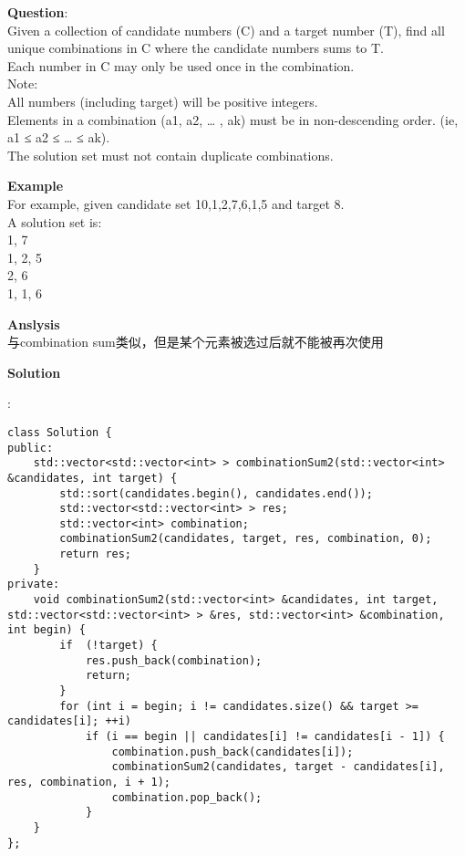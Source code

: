     
\begin{description}
    \item{\textbf{Question}}:\\%
		Given a collection of candidate numbers (C) and a target number (T), find all unique combinations in C where the candidate numbers sums to T.\\
		Each number in C may only be used once in the combination.\\
		Note:\\
		All numbers (including target) will be positive integers.\\
		Elements in a combination (a1, a2, … , ak) must be in non-descending order. (ie, a1 ≤ a2 ≤ … ≤ ak).\\
		The solution set must not contain duplicate combinations.\\

    \item{\textbf{Example}}\\
		For example, given candidate set 10,1,2,7,6,1,5 and target 8.\\
		A solution set is:\\
		1, 7\\
		1, 2, 5\\
		2, 6\\
		1, 1, 6\\

    \item{\textbf{Anslysis}}\\
		与combination sum类似，但是某个元素被选过后就不能被再次使用\\

    \item{\textbf{Solution}}\\
	\item{} : \\
		\begin{lstlisting}
class Solution {
public:
    std::vector<std::vector<int> > combinationSum2(std::vector<int> &candidates, int target) {
        std::sort(candidates.begin(), candidates.end());
        std::vector<std::vector<int> > res;
        std::vector<int> combination;
        combinationSum2(candidates, target, res, combination, 0);
        return res;
    }
private:
    void combinationSum2(std::vector<int> &candidates, int target, std::vector<std::vector<int> > &res, std::vector<int> &combination, int begin) {
        if  (!target) {
            res.push_back(combination);
            return;
        }
        for (int i = begin; i != candidates.size() && target >= candidates[i]; ++i)
            if (i == begin || candidates[i] != candidates[i - 1]) {
                combination.push_back(candidates[i]);
                combinationSum2(candidates, target - candidates[i], res, combination, i + 1);
                combination.pop_back();
            }
    }
};		\end{lstlisting}

\end{description}

